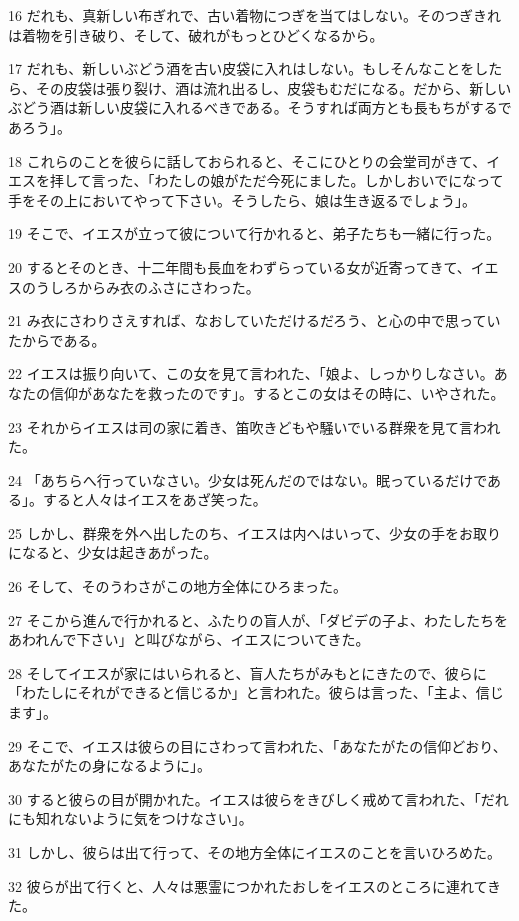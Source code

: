 \par 16 だれも、真新しい布ぎれで、古い着物につぎを当てはしない。そのつぎきれは着物を引き破り、そして、破れがもっとひどくなるから。
\par 17 だれも、新しいぶどう酒を古い皮袋に入れはしない。もしそんなことをしたら、その皮袋は張り裂け、酒は流れ出るし、皮袋もむだになる。だから、新しいぶどう酒は新しい皮袋に入れるべきである。そうすれば両方とも長もちがするであろう」。
\par 18 これらのことを彼らに話しておられると、そこにひとりの会堂司がきて、イエスを拝して言った、「わたしの娘がただ今死にました。しかしおいでになって手をその上においてやって下さい。そうしたら、娘は生き返るでしょう」。
\par 19 そこで、イエスが立って彼について行かれると、弟子たちも一緒に行った。
\par 20 するとそのとき、十二年間も長血をわずらっている女が近寄ってきて、イエスのうしろからみ衣のふさにさわった。
\par 21 み衣にさわりさえすれば、なおしていただけるだろう、と心の中で思っていたからである。
\par 22 イエスは振り向いて、この女を見て言われた、「娘よ、しっかりしなさい。あなたの信仰があなたを救ったのです」。するとこの女はその時に、いやされた。
\par 23 それからイエスは司の家に着き、笛吹きどもや騒いでいる群衆を見て言われた。
\par 24 「あちらへ行っていなさい。少女は死んだのではない。眠っているだけである」。すると人々はイエスをあざ笑った。
\par 25 しかし、群衆を外へ出したのち、イエスは内へはいって、少女の手をお取りになると、少女は起きあがった。
\par 26 そして、そのうわさがこの地方全体にひろまった。
\par 27 そこから進んで行かれると、ふたりの盲人が、「ダビデの子よ、わたしたちをあわれんで下さい」と叫びながら、イエスについてきた。
\par 28 そしてイエスが家にはいられると、盲人たちがみもとにきたので、彼らに「わたしにそれができると信じるか」と言われた。彼らは言った、「主よ、信じます」。
\par 29 そこで、イエスは彼らの目にさわって言われた、「あなたがたの信仰どおり、あなたがたの身になるように」。
\par 30 すると彼らの目が開かれた。イエスは彼らをきびしく戒めて言われた、「だれにも知れないように気をつけなさい」。
\par 31 しかし、彼らは出て行って、その地方全体にイエスのことを言いひろめた。
\par 32 彼らが出て行くと、人々は悪霊につかれたおしをイエスのところに連れてきた。
